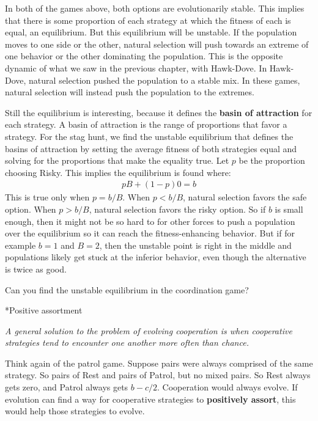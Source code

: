 \documentclass[10pt,reqno]{amsbook}
\makeatletter
\newcommand{\bemph}[1]{{\textbf{\textcolor{bemphcol}{#1}}}}
\renewcommand\section{\@startsection{section}{1}
\z@{.7\linespacing\@plus\linespacing}{.5\linespacing}
{\large\bfseries\itshape}}
\numberwithin{equation}{chapter}
\newenvironment{precis}
{\noi\itshape}
{\vspace{6pt}}
\newcommand{\noi}{\noindent}
\makeatother
\begin{document}
In both of the games above, both options are evolutionarily stable. This implies that there is some proportion of each strategy at which the fitness of each is equal, an equilibrium. But this equilibrium will be unstable. If the population moves to one side or the other, natural selection will push towards an extreme of one behavior or the other dominating the population. This is the opposite dynamic of what we saw in the previous chapter, with Hawk-Dove. In Hawk-Dove, natural selection pushed the population to a stable mix. In these games, natural selection will instead push the population to the extremes.

Still the equilibrium is interesting, because it defines the \bemph{basin of attraction} for each strategy. A basin of attraction is the range of proportions that favor a strategy. For the stag hunt, we find the unstable equilibrium that defines the basins of attraction by setting the average fitness of both strategies equal and solving for the proportions that make the equality true. Let $p$ be the proportion choosing Risky. This implies the equilibrium is found where:
\begin{align*}
	p B + (1-p)0 = b
\end{align*}
This is true only when $p=b/B$. When $p < b/B$, natural selection favors the safe option. When $p>b/B$, natural selection favors the risky option. So if $b$ is small enough, then it might not be so hard to for other forces to push a population over the equilibrium so it can reach the fitness-enhancing behavior. But if for example $b=1$ and $B=2$, then the unstable point is right in the middle and populations likely get stuck at the inferior behavior, even though the alternative is twice as good.

Can you find the unstable equilibrium in the coordination game?

\section*{Positive assortment}

\begin{precis}A general solution to the problem of evolving cooperation is when cooperative strategies tend to encounter one another more often than chance.\end{precis}

Think again of the patrol game. Suppose pairs were always comprised of the same strategy. So pairs of Rest and pairs of Patrol, but no mixed pairs. So Rest always gets zero, and Patrol always gets $b-c/2$. Cooperation would always evolve. If evolution can find a way for cooperative strategies to \bemph{positively assort}, this would help those strategies to evolve.
\end{document}
